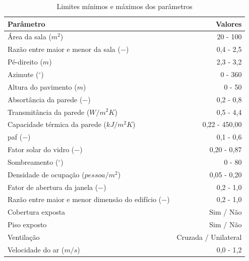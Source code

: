 \documentclass[brazil,hardcopy,openany]{ufscthesis} %
\begin{document}
\begin{table}[H]
	\centering
	\caption{Limites mínimos e máximos dos parâmetros}
	\label{table:param_def}	
	\begin{tabular}{|l |r |}
		\hline
		\textbf{Parâmetro} & \textbf{Valores} \\
		\hline
		Área da sala ($m^2$) & 20 - 100 \\
		\hline
		Razão entre maior e menor da sala ($-$) & 0,4 - 2,5 \\
		\hline
		Pé-direito ($m$) & 2,3 - 3,2 \\
		\hline
		Azimute ($^{\circ}$) & 0 - 360 \\
		\hline
		Altura do pavimento ($m$) & 0 - 50 \\
		\hline 
		Absortância da parede ($-$) & 0,2 - 0,8 \\
		\hline 
		Transmitância da parede ($W/m^2K$) & 0,5 - 4,4 \\
		\hline 
		Capacidade térmica da parede ($kJ/m^2K$) & 0,22 - 450,00 \\
		\hline 
		\Acrlong{paf} ($-$) & 0,1 - 0,6 \\
		\hline 
		Fator solar do vidro ($-$) & 0,20 - 0,87 \\
		\hline 
		Sombreamento ($^{\circ}$) & 0 - 80 \\
		\hline 
		Densidade de ocupação ($pessoa/m^2$) & 0,05 - 0,20 \\
		\hline 
		Fator de abertura da janela ($-$) & 0,2 - 1,0 \\
		\hline 
		Razão entre maior e menor dimensão do edifício ($-$) & 0,2 - 1,0 \\
		\hline 
		Cobertura exposta & Sim / Não\\
		\hline 
		Piso exposto & Sim / Não\\
		\hline 
		Ventilação & Cruzada / Unilateral\\
		\hline 
		Velocidade do ar ($m/s$) & 0,0 - 1,2 \\
		\hline 
	\end{tabular}
\end{table}
\end{document}
